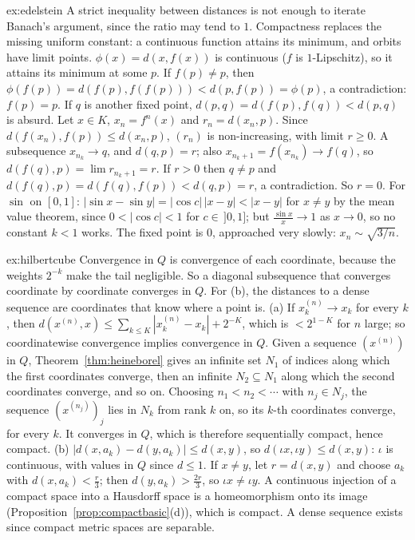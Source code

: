 \begin{solution}{ex:edelstein}
\idea A strict inequality between distances is not enough to iterate Banach's argument, since the ratio may tend to $1$. Compactness replaces
the missing uniform constant: a continuous function attains its minimum, and orbits have limit points.
\writeup $\phi(x)=d(x,f(x))$ is continuous ($f$ is $1$-Lipschitz), so it attains its minimum at some $p$. If $f(p)\ne p$, then $\phi(f(p))=d(f(p),f(f(p)))<d(p,f(p))=\phi(p)$, a
contradiction: $f(p)=p$. If $q$ is another fixed point, $d(p,q)=d(f(p),f(q))<d(p,q)$ is absurd. Let $x\in K$, $x_n=f^n(x)$ and $r_n=d(x_n,p)$. Since $d(f(x_n),f(p))\le d(x_n,p)$,
$(r_n)$ is non-increasing, with limit $r\ge0$. A subsequence $x_{n_k}\to q$, and $d(q,p)=r$; also $x_{n_k+1}=f(x_{n_k})\to f(q)$, so $d(f(q),p)=\lim r_{n_k+1}=r$. If $r>0$ then $q\ne p$ and
$d(f(q),p)=d(f(q),f(p))<d(q,p)=r$, a contradiction. So $r=0$. For $\sin$ on $[0,1]$: $|\sin x-\sin y|=|\cos c|\,|x-y|<|x-y|$ for $x\ne y$ by the mean value theorem, since
$0<|\cos c|<1$ for $c\in\,]0,1]$; but $\frac{\sin x}x\to1$ as $x\to0$, so no constant $k<1$ works. The fixed point is $0$, approached very slowly: $x_n\sim\sqrt{3/n}$.
\end{solution}

\begin{solution}{ex:hilbertcube}
\idea Convergence in $Q$ is convergence of each coordinate, because the weights $2^{-k}$ make the tail negligible. So a diagonal subsequence that
converges coordinate by coordinate converges in $Q$. For (b), the distances to a dense sequence are coordinates that know where a point is.
\writeup (a) If $x^{(n)}_k\to x_k$ for every $k$, then $d(x^{(n)},x)\le\sum_{k\le K}|x^{(n)}_k-x_k|+2^{-K}$, which is $<2^{1-K}$ for $n$ large; so coordinatewise convergence implies
convergence in $Q$. Given a sequence $(x^{(n)})$ in $Q$, Theorem~\ref{thm:heineborel} gives an infinite set $N_1$ of indices along which the first coordinates converge, then
an infinite $N_2\subseteq N_1$ along which the second coordinates converge, and so on. Choosing $n_1<n_2<\cdots$ with $n_j\in N_j$, the sequence $(x^{(n_j)})_j$ lies in $N_k$ from rank $k$
on, so its $k$-th coordinates converge, for every $k$. It converges in $Q$, which is therefore sequentially compact, hence compact.
(b) $|d(x,a_k)-d(y,a_k)|\le d(x,y)$, so $d(\iota x,\iota y)\le d(x,y)$: $\iota$ is continuous, with values in $Q$ since $d\le1$. If $x\ne y$, let $r=d(x,y)$ and choose $a_k$ with $d(x,a_k)<\frac r3$;
then $d(y,a_k)>\frac{2r}3$, so $\iota x\ne\iota y$. A continuous injection of a compact space into a Hausdorff space is a homeomorphism onto its image
(Proposition~\ref{prop:compactbasic}(d)), which is compact. A dense sequence exists since compact metric spaces are separable.
\end{solution}

